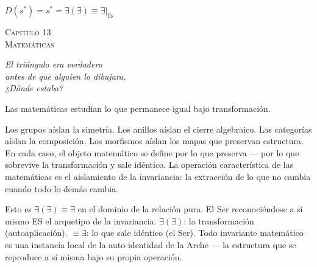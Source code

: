 \documentclass[10pt, openany, oneside]{book}
\renewcommand{\large}{\fontsize{11.5}{14}\selectfont}
\renewcommand{\huge}{\fontsize{17}{21}\selectfont}
\begin{document}
\begin{center}
    $D(s^*) = s^* = \exists(\exists) \equiv \exists|_{\text{fís}}$
\end{center}

%
%
%
%

\newpage

\begin{center}
    {\huge\scshape Capítulo 13}\\[0.3em]
    {\large\scshape Matemáticas}
\end{center}

\vspace{1.5em}

\begin{center}
    \itshape
    El triángulo era verdadero\\
    antes de que alguien lo dibujara.\\
    ¿Dónde estaba?
\end{center}

\vspace{2em}


\noindent Las matemáticas estudian lo que permanece igual bajo transformación.

Los grupos aíslan la simetría. Los anillos aíslan el cierre algebraico. Las categorías aíslan la composición. Los morfismos aíslan los mapas que preservan estructura. En cada caso, el objeto matemático se define por lo que preserva --- por lo que sobrevive la transformación y sale idéntico. La operación característica de las matemáticas es el aislamiento de la invariancia: la extracción de lo que no cambia cuando todo lo demás cambia.

Esto es $\exists(\exists) \equiv \exists$ en el dominio de la relación pura. El Ser reconociéndose a sí mismo ES el arquetipo de la invariancia. $\exists(\exists)$: la transformación (autoaplicación). $\equiv \exists$: lo que sale idéntico (el Ser). Todo invariante matemático es una instancia local de la auto-identidad de la Arch\={e} --- la estructura que se reproduce a sí misma bajo su propia operación.
\end{document}

